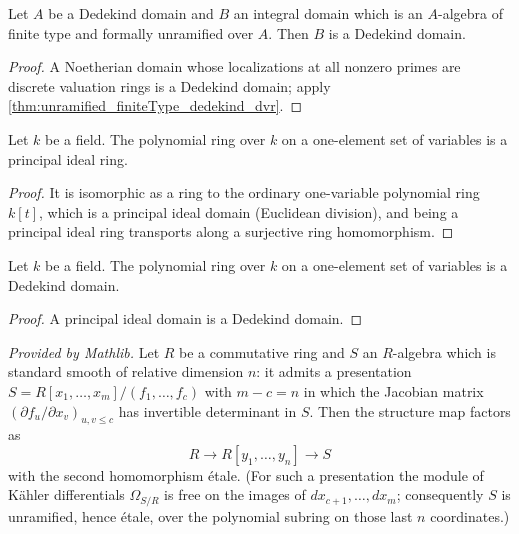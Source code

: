 \begin{corollary}
  \label{cor:unramified_finiteType_dedekind}
  \leanok
  Let \(A\) be a Dedekind domain and \(B\) an integral domain which is an \(A\)-algebra of
  finite type and formally unramified over \(A\). Then \(B\) is a Dedekind domain.
\end{corollary}
\begin{proof}
  \leanok
  A Noetherian domain whose localizations at all nonzero primes are discrete valuation
  rings is a Dedekind domain; apply \ref{thm:unramified_finiteType_dedekind_dvr}.
\end{proof}

\begin{lemma}
  \label{lem:mvpoly_fin_one_pid}
  \leanok
  Let \(k\) be a field. The polynomial ring over \(k\) on a one-element set of variables is
  a principal ideal ring.
\end{lemma}
\begin{proof}
  \leanok
  It is isomorphic as a ring to the ordinary one-variable polynomial ring \(k[t]\), which
  is a principal ideal domain (Euclidean division), and being a principal ideal ring
  transports along a surjective ring homomorphism.
\end{proof}

\begin{lemma}
  \label{lem:mvpoly_fin_one_dedekind}
  \leanok
  Let \(k\) be a field. The polynomial ring over \(k\) on a one-element set of variables is
  a Dedekind domain.
\end{lemma}
\begin{proof}
  \leanok
  A principal ideal domain is a Dedekind domain.
\end{proof}

\begin{theorem}
  \label{thm:standard_smooth_etale_structure}
  \mathlibok
  \textit{Provided by Mathlib.}
  Let \(R\) be a commutative ring and \(S\) an \(R\)-algebra which is standard smooth of
  relative dimension \(n\): it admits a presentation
  \(S = R[x_1,\dots,x_m]/(f_1,\dots,f_c)\) with \(m - c = n\) in which the Jacobian matrix
  \((\partial f_u/\partial x_v)_{u,v \le c}\) has invertible determinant in \(S\). Then the
  structure map factors as
  \[
    R \longrightarrow R[y_1, \dots, y_n] \longrightarrow S
  \]
  with the second homomorphism \'etale. (For such a presentation the module of K\"ahler
  differentials \(\Omega_{S/R}\) is free on the images of
  \(dx_{c+1}, \dots, dx_m\); consequently \(S\) is unramified, hence \'etale, over the
  polynomial subring on those last \(n\) coordinates.)
\end{theorem}

